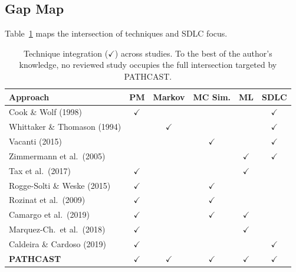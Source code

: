 \subsection{Gap Map}
\label{sec:gap-deficits}
Table~\ref{tab:gap} maps the intersection of techniques and SDLC focus.

\begin{table}[htbp]
\centering
\caption{Technique integration ($\checkmark$) across studies. To the best of
the author's knowledge, no reviewed study occupies the full intersection
targeted by PATHCAST.}
\label{tab:gap}
\small
\begin{tabular}{p{3.8cm}ccccc}
\toprule
\textbf{Approach} & \textbf{PM} & \textbf{Markov} &
\textbf{MC Sim.} & \textbf{ML} & \textbf{SDLC} \\
\midrule
Cook \& Wolf (1998)             & $\checkmark$ &              &              &              & $\checkmark$ \\
Whittaker \& Thomason (1994)    &              & $\checkmark$ &              &              & $\checkmark$ \\
Vacanti (2015)                  &              &              & $\checkmark$ &              & $\checkmark$ \\
Zimmermann et al.\ (2005)        &              &              &              & $\checkmark$ & $\checkmark$ \\
Tax et al.\ (2017)               & $\checkmark$ &              &              & $\checkmark$ &              \\
Rogge-Solti \& Weske (2015)     & $\checkmark$ &              & $\checkmark$ &              &              \\
Rozinat et al.\ (2009)           & $\checkmark$ &              & $\checkmark$ &              &              \\
Camargo et al.\ (2019)          & $\checkmark$ &              & $\checkmark$ & $\checkmark$ &              \\
Marquez-Ch.\ et al.\ (2018)       & $\checkmark$ &              &              & $\checkmark$ &              \\
Caldeira \& Cardoso (2019)     & $\checkmark$ &              &              &              & $\checkmark$ \\
\midrule
\textbf{PATHCAST} & $\boldsymbol{\checkmark}$ & $\boldsymbol{\checkmark}$ &
$\boldsymbol{\checkmark}$ & $\boldsymbol{\checkmark}$ & $\boldsymbol{\checkmark}$ \\
\bottomrule
\end{tabular}
\end{table}

